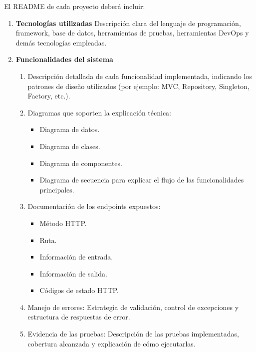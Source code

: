 \documentclass[12pt]{article}
\begin{document}
El README de cada proyecto deberá incluir:

\begin{enumerate}
    \item \textbf{Tecnologías utilizadas}  
    Descripción clara del lenguaje de programación, framework, base de datos, herramientas de pruebas, herramientas DevOps y demás tecnologías empleadas.

    \item \textbf{Funcionalidades del sistema}
    \begin{enumerate}
        \item Descripción detallada de cada funcionalidad implementada, indicando los patrones de diseño utilizados (por ejemplo: MVC, Repository, Singleton, Factory, etc.).
        
        \item Diagramas que soporten la explicación técnica:
        \begin{itemize}
            \item Diagrama de datos.
            \item Diagrama de clases.
            \item Diagrama de componentes.
            \item Diagrama de secuencia para explicar el flujo de las funcionalidades principales.
        \end{itemize}
        
        \item Documentación de los endpoints expuestos:
        \begin{itemize}
            \item Método HTTP.
            \item Ruta.
            \item Información de entrada.
            \item Información de salida.
            \item Códigos de estado HTTP.
        \end{itemize}
        
        \item Manejo de errores:  
        Estrategia de validación, control de excepciones y estructura de respuestas de error.
        
        \item Evidencia de las pruebas:  
        Descripción de las pruebas implementadas, cobertura alcanzada y explicación de cómo ejecutarlas.
    \end{enumerate}


\end{enumerate}
\end{document}
